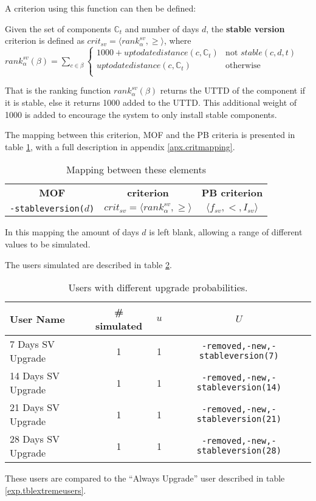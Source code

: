 A criterion using this function can then be defined:
\begin{defs}
	Given the set of components $\mathbb{C}_t$ and number of days $d$, the \textbf{stable version} criterion is defined as $crit_{sv} = \langle rank^{sv}_{\alpha}, \geq \rangle$,
	where \\$rank^{sv}_{\alpha}(\beta) = \sum_{c \in \beta} \begin{cases} 1000 + uptodatedistance(c,\mathbb{C}_t)& \text{not }stable(c,d,t) \\ uptodatedistance(c,\mathbb{C}_t) & \text{otherwise} \\  \end{cases}$
\end{defs}
That is the ranking function $rank^{sv}_{\alpha}(\beta)$ returns the UTTD of the component if it is stable,
else it returns 1000 added to the UTTD.
This additional weight of 1000 is added to encourage the system to only install stable components.

The mapping between this criterion, MOF and the PB criteria is presented in table \ref{exp.stablcritmapping}, with a full description in appendix \ref{apx.critmapping}.
\begin{table}[htp]
\begin{tabular}{c | c | c}
\textbf{MOF} 		& \textbf{\modelname criterion} & \textbf{PB criterion} \\
\texttt{-stableversion(}$d$\texttt{)} & $crit_{sv} = \langle rank^{sv}_{\alpha}, \geq \rangle$ & $\langle f_{sv}, <, I_{sv} \rangle$ \\
\end{tabular}
\caption{Mapping between these elements}
\label{exp.stablcritmapping}
\end{table}
In this mapping the amount of days $d$ is left blank, allowing a range of different values to be simulated.

The users simulated are described in table \ref{exp.tblsvusers}.
\begin{table}[h!]
\centering
\begin{tabular}{|l | c | c | c | }
\hline
User Name 				& \# simulated 	& $u$ 	& $U$ 			\\ \hline
7 Days SV Upgrade		& 1 			& 1 & 	\texttt{-removed,-new,-stableversion(7)}			 \\
14 Days SV Upgrade		& 1 			& 1 & 	\texttt{-removed,-new,-stableversion(14)}			\\
21 Days SV Upgrade		& 1 			& 1 & 	\texttt{-removed,-new,-stableversion(21)}			 \\
28 Days SV Upgrade 		& 1 			& 1 & 	\texttt{-removed,-new,-stableversion(28)}			\\ \hline
\end{tabular}
\caption{Users with different upgrade probabilities.}
\label{exp.tblsvusers}
\end{table}
These users are compared to the ``Always Upgrade'' user described in table \ref{exp.tblextremeusers}.

